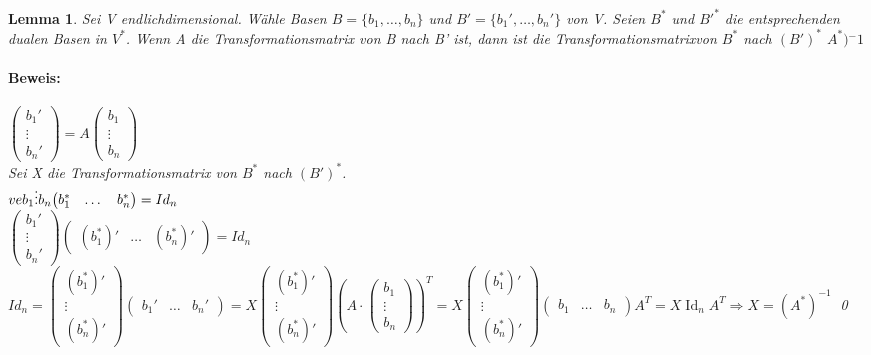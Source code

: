 \documentclass{report}
\newcommand{\ve}[1]{{\begin{pmatrix}#1 \end{pmatrix}}}
\DeclareMathOperator{\Id}{Id}
\theoremstyle{customrem}
\theoremstyle{customdef}
\newtheorem{lemma}[definition]{Lemma}
\renewenvironment{proof}{\paragraph{Beweis: }}{\qed}
\theoremstyle{customenv}
\begin{document}
\begin{lemma}
  Sei V endlichdimensional. W\"ahle Basen \(B = \{b_1, \dots, b_n\}\) und
  \(B' = \{b_1', \dots, b_n'\}\) von V. Seien \(B^*\) und \(B'^*\) die
  entsprechenden dualen Basen in \(V^*\). Wenn A die Transformationsmatrix
  von B nach B' ist, dann ist die Transformationsmatrixvon \(B^*\) nach
  \((B')^*\) \(A^*){^-1}\)\\
  \begin{proof}
    \(\ve{b_1' \\ \vdots \\ b_n'} = A\ve{b_1 \\ \vdots \\ b_n}\)\\
    Sei X die Transformationsmatrix von \(B^*\) nach \((B')^*\).\\
    \(ve{b_1 \\ \vdots \\ b_n} \ve{b_1^*& \dots& b_n^*} = Id_n\)\\
    \(\ve{b_1' \\ \vdots \\ b_n'} \ve{(b_1^*)' & \dots & (b_n^*)'} = Id_n\)\\
    \(Id_n = \ve{(b_1^*)' \\ \vdots \\ (b_n^*)'} \ve{b_1' & \dots & b_n'}
    = X \ve{(b_1^*)' \\ \vdots \\ (b_n^*)'} (A \cdot \ve{b_1 \\ \vdots \\ b_n})^T
    = X \ve{(b_1^*)' \\ \vdots \\ (b_n^*)'} \ve{b_1 & \dots & b_n} A^T
    = X  \Id_n A^T
    \Rightarrow X = (A^*)^{-1}
    \)
  \end{proof}
\end{lemma}
\end{document}
